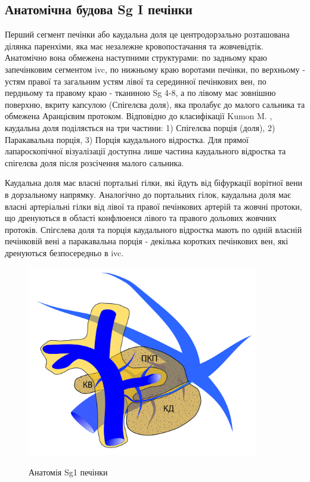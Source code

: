 \subsection{Анатомічна будова Sg I печінки}

Перший сегмент печінки або каудальна доля це центродорзально розташована ділянка паренхіми, яка має незалежне кровопостачання та жовчевідтік. Анатомічно вона обмежена наступними структурами: по задньому краю запечінковим сегментом \acrshort{ivc}, по нижньому краю воротами печінки, по верхньому - устям правої та загальним устям лівої та серединної печінкових вен, по пердньому та правому краю - тканиною Sg 4-8, а по лівому має зовнішню поверхню, вкриту капсулою (Спігелєва доля), яка пролабує до малого сальника та обмежена Аранцієвим протоком. Відповідно до класифікації Kumon M. \cite{Kumon2017}, каудальна доля поділяється на три частини: 1) Спігелєва порція (доля),  2) Паракавальна порція, 3) Порція каудального відростка. Для прямої лапароскопічної візуалізації  доступна лише частина каудального відростка та спігелєва доля після розсічення малого сальника.

Каудальна доля має власні портальні гілки, які йдуть від біфуркації ворітної вени в дорзальному напрямку. Аналогічно до портальних гілок, каудальна доля має власні артеріальні гілки від лівої та правої печінкових артерій та жовчні протоки, що дренуються в області конфлюенся лівого та правого дольових жовчних протоків. Спігєлева доля та порція каудального відростка мають по одній власній печінковій вені а паракавальна порція - декілька коротких печінкових вен, які дренуються безпосередньо в \acrshort{ivc}. 

\begin{figure}[h]
\caption{Анатомія Sg1 печінки}
\centering
\includegraphics[width=0.9\textwidth]{Illustrations/Chapter_01/Sg1.jpg}
\label{fig:Sg1}
\end{figure}

